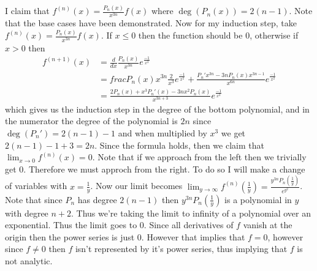 \documentclass[12pt, letterpaper]{article}
\begin{document}
\begin{enumerate}
	I claim that $f^{(n)} (x) = \frac{P_n(x)}{x^{3n}}f(x)$ where $\deg(P_n(x)) = 2(n-1)$.  Note that the base cases have been demonstrated.  Now for my induction step, take
	$f^(n)(x) = \frac{P_n(x)}{x^{3n}}f(x)$.  If $x \leq 0$ then the function should be 0, otherwise if $x>0$ then \begin{align*}
	f^{(n+1)}(x) &= \frac{d}{dx}\frac{P_n(x)}{x^{3n}}e^{\frac{-1}{x^2}}\\
	&= frac{P_n(x)}{x^{3n}} \frac{2}{x^3}e^{\frac{-1}{x^2}} + \frac{P_n' x^{3n} - 3n P_n(x)x^{3n - 1}}{x^{6n}}e^{\frac{-1}{x^2}}\\
	&= \frac{2P_n(x) + x^3 P_n'(x) - 3 n x^2 P_n(x)}{x^{3n+3}}e^{\frac{-1}{x^2}}
	\end{align*}
	which gives us the induction step in the degree of the bottom polynomial, and in 
	the numerator the degree of the polynomial is $2n$ since $\deg(P_n') = 2(n-1) - 1$
	and when multiplied by $x^3$ we get $2(n-1) - 1 + 3 = 2n$.  Since the formula holds,
	then we claim that $\lim_{x \to 0} f^{(n)}(x) = 0$.  Note that if we approach from 
	the left then we trivially get 0.  Therefore we must approch from the right.  
	To do so I will make a change of variables with $x = \frac{1}{y}$.  Now our limit 
	becomes $\lim_{y \to \infty} f^{(n)} (\frac{1}{y}) = \frac{y^{3n} P_n(\frac{1}{y})}{e^{y^2}}$.  Note that since $P_n$ has degree $2(n-1)$ then $y^{3n} P_n(\frac{1}{y})$
	is a polynomial in $y$ with degree $n + 2$.  Thus we're taking the limit to infinity 
	of a polynomial over an exponential.  Thus the limit goes to 0.  Since all derivatives of $f$ vanish at the origin then the power series is just 0.  However that 
	implies that $f = 0$, however since $f \neq 0$ then $f$ isn't represented by it's power series, thus implying that $f$ is not analytic.  
\end{enumerate}
\end{document}
